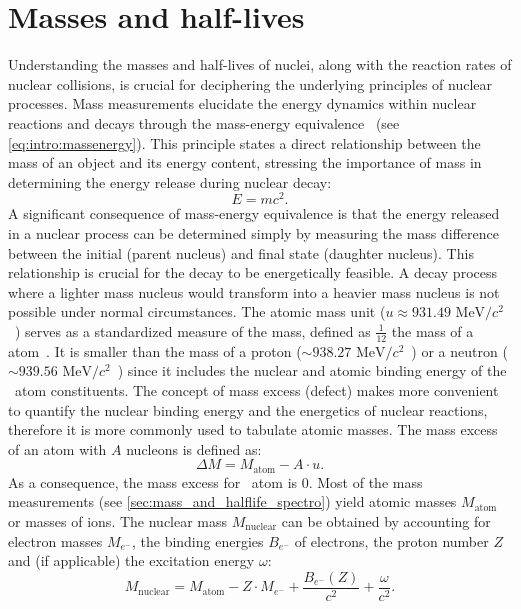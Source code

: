 \section{Masses and half-lives}\label{sec:intro:masses_and_halflives}
Understanding the masses and half-lives of nuclei, along with the reaction rates of nuclear collisions, is crucial for deciphering the underlying principles of nuclear processes. Mass measurements elucidate the energy dynamics within nuclear reactions and decays through the mass-energy equivalence~\cite{energymass} (see \cref{eq:intro:massenergy}). This principle states a direct relationship between the mass of an object and its energy content, stressing the importance of mass in determining the energy release during nuclear decay:
\begin{equation}
    E = mc^2.
    \label{eq:intro:massenergy}
\end{equation}
A significant consequence of mass-energy equivalence is that the energy released in a nuclear process can be determined simply by measuring the mass difference between the initial (parent nucleus) and final state (daughter nucleus). This relationship is crucial for the decay to be energetically feasible. A decay process where a lighter mass nucleus would transform into a heavier mass nucleus is not possible under normal circumstances.
\newpar
The atomic mass unit ($u\approx 931.49\,\,\mathrm{MeV}/c^2$~\cite{CODATA}) serves as a standardized measure of the mass, defined as $\frac{1}{12}$ the mass of a \, atom~\cite{IUPAC}.
It is smaller than the mass of a proton ($\sim 938.27$ $\mathrm{MeV}/c^2$~\cite{CODATA}) or a neutron ($\sim 939.56$ $\mathrm{MeV}/c^2$~\cite{CODATA}) since it includes the nuclear and atomic binding energy of the \, atom constituents. 
The concept of mass excess (defect) makes more convenient to quantify the nuclear binding energy and the energetics of nuclear reactions, therefore it is more commonly used to tabulate atomic masses. The mass excess of an atom with $A$ nucleons is defined as:
\begin{equation}
    \Delta M = M_{\mathrm{atom}} - A \cdot u.
\end{equation}
As a consequence, the mass excess for \, atom is $0$.
\newpar
Most of the mass measurements (see \cref{sec:mass_and_halflife_spectro}) yield atomic masses $M_{\mathrm{atom}}$ or masses of ions.
The nuclear mass $M_{\mathrm{nuclear}}$ can be obtained by accounting for electron masses $M_{e^{-}}$, the binding energies $B_{e^{-}}$ of electrons, the proton number $Z$ and (if applicable) the excitation energy $\omega$:
\begin{equation}
    M_{\mathrm{nuclear}} = M_{\mathrm{atom}} - Z \cdot M_{e^{-}} + \frac{B_{e^{-}}\left(Z\right)}{c^2} + \frac{\omega}{c^2}.
\end{equation}


